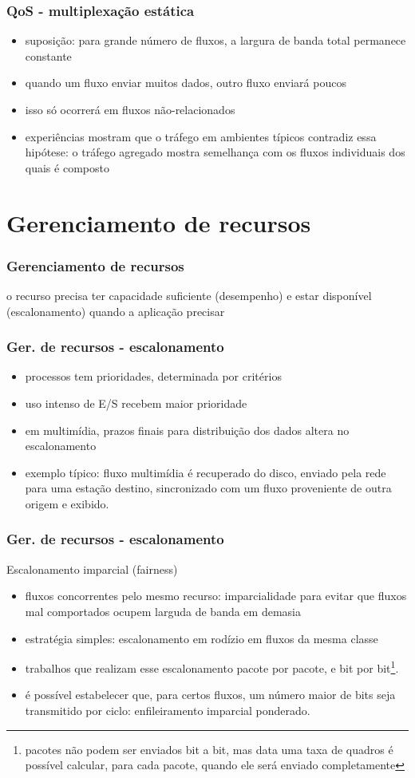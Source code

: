 \documentclass[]{beamer}
\begin{document}
\begin{frame}
  \frametitle{QoS - multiplexação estática}
\begin{itemize}
  \item suposição: para grande número de fluxos, a largura de banda total
permanece constante
  \item quando um fluxo enviar muitos dados, outro fluxo enviará poucos
  \item isso só ocorrerá em fluxos não-relacionados
  \item experiências mostram que o tráfego em ambientes típicos contradiz essa hipótese:
o tráfego agregado mostra semelhança com os fluxos individuais dos quais é composto
\end{itemize}
\end{frame}

\section{Gerenciamento de recursos}

\begin{frame}
  \frametitle{Gerenciamento de recursos}
  o recurso precisa ter capacidade suficiente (desempenho) e estar disponível
(escalonamento) quando a aplicação precisar
\end{frame}

\begin{frame}
  \frametitle{Ger. de recursos - escalonamento}
\begin{itemize}
  \item processos tem prioridades, determinada por critérios
  \item uso intenso de E/S recebem maior prioridade
  \item em multimídia, prazos finais para distribuição dos dados altera no escalonamento
  \item exemplo típico: fluxo multimídia é recuperado do disco, enviado pela rede para
uma estação destino, sincronizado com um fluxo proveniente de outra origem e exibido.
\end{itemize}
\end{frame}

\begin{frame}
  \frametitle{Ger. de recursos - escalonamento}
Escalonamento imparcial (fairness)
\begin{itemize}
  \item fluxos concorrentes pelo mesmo recurso: imparcialidade para evitar que
fluxos mal comportados ocupem larguda de banda em demasia
  \item estratégia simples: escalonamento em rodízio em fluxos da mesma classe
  \item trabalhos que realizam esse escalonamento pacote por pacote, e bit por 
bit\footnote{pacotes não podem ser enviados bit a bit, mas data uma taxa de quadros é possível
calcular, para cada pacote, quando ele será enviado completamente}.
  \item é possível estabelecer que, para certos fluxos, um número maior de bits seja transmitido
por ciclo: enfileiramento imparcial ponderado.
\end{itemize}
\end{frame}
\end{document}
